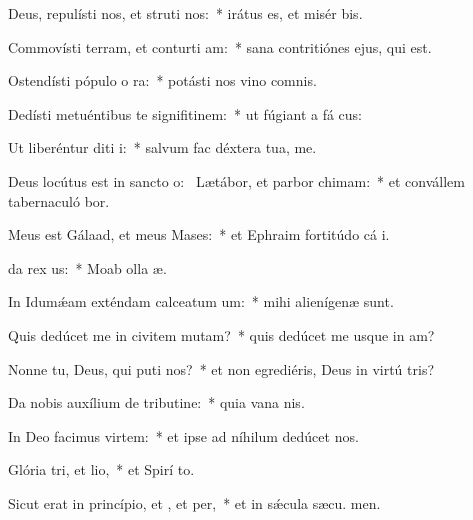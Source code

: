 \item Deus, repulísti nos, et struti nos:~* irátus es, et misér  bis.
\item Commovísti terram, et conturti am:~* sana contritiónes ejus, qui  est.
\item Ostendísti pópulo o ra:~* potásti nos vino comnis.
\item Dedísti metuéntibus te signifitinem:~* ut fúgiant a fá cus:
\item Ut liberéntur diti i:~* salvum fac déxtera tua,   me.
\item Deus locútus est in sancto o:~\pscross{} Lætábor, et parbor chimam:~* et convállem tabernaculó bor.
\item Meus est Gálaad, et meus  Mases:~* et Ephraim fortitúdo cá i.
\item {}da rex us:~* Moab olla  æ.
\item In Idumǽam exténdam calceatum um:~* mihi alienígenæ  sunt.
\item Quis dedúcet me in civitem mutam?~* quis dedúcet me usque in am?
\item Nonne tu, Deus, qui puti nos?~* et non egrediéris, Deus in virtú tris?
\item Da nobis auxílium de tributine:~* quia vana  nis.
\item In Deo facimus virtem:~* et ipse ad níhilum dedúcet  nos.
\item Glória tri, et lio,~* et Spirí to.
\item Sicut erat in princípio, et , et per,~* et in sǽcula sæcu. men.
